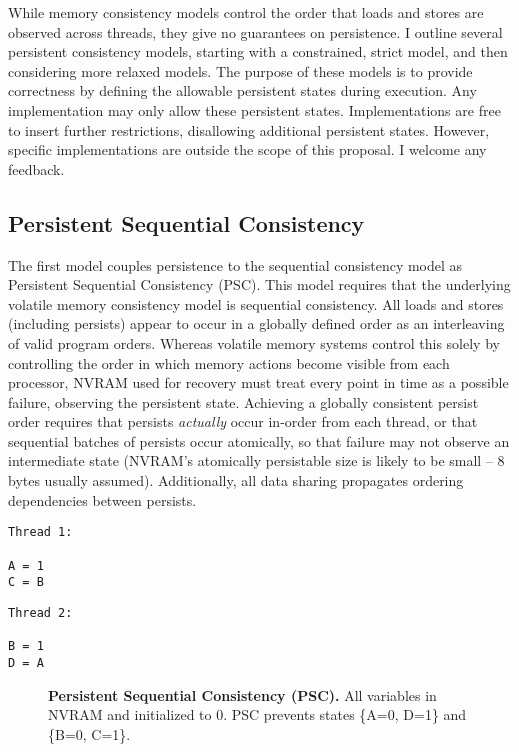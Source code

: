 While memory consistency models control the order that loads and stores are observed across threads, they give no guarantees on persistence.
I outline several persistent consistency models, starting with a constrained, strict model, and then considering more relaxed models.
The purpose of these models is to provide correctness by defining the allowable persistent states during execution.
Any implementation may only allow these persistent states.
Implementations are free to insert further restrictions, disallowing additional persistent states.
However, specific implementations are outside the scope of this proposal.
I welcome any feedback.

\subsection{Persistent Sequential Consistency}
\label{sec:PMC:PersistenceModels:PSC}

The first model couples persistence to the sequential consistency model as Persistent Sequential Consistency (PSC).
This model requires that the underlying volatile memory consistency model is sequential consistency.
All loads and stores (including persists) appear to occur in a globally defined order as an interleaving of valid program orders.
Whereas volatile memory systems control this solely by controlling the order in which memory actions become visible from each processor, NVRAM used for recovery must treat every point in time as a possible failure, observing the persistent state.
Achieving a globally consistent persist order requires that persists \emph{actually} occur in-order from each thread, or that sequential batches of persists occur atomically, so that failure may not observe an intermediate state (NVRAM's atomically persistable size is likely to be small -- 8 bytes usually assumed).
Additionally, all data sharing propagates ordering dependencies between persists.

{
\singlespacing
\newsavebox{\PSCThreadOne}
\begin{lrbox}{\PSCThreadOne}
  \begin{lstlisting}
Thread 1:

A = 1
C = B
  \end{lstlisting}
\end{lrbox}

\newsavebox{\PSCThreadTwo}
\begin{lrbox}{\PSCThreadTwo}
  \begin{lstlisting}
Thread 2:

B = 1
D = A
  \end{lstlisting}
\end{lrbox}

\begin{figure}[]
\centering
\subfigure{ \usebox{\PSCThreadOne} }
\hspace{1 in}
\subfigure{ \usebox{\PSCThreadTwo} }
\caption{\textbf{Persistent Sequential Consistency (PSC).} All variables in NVRAM and initialized to 0.  PSC prevents states \{A=0, D=1\} and \{B=0, C=1\}.}
\label{fig:PSC}
\end{figure}
}

